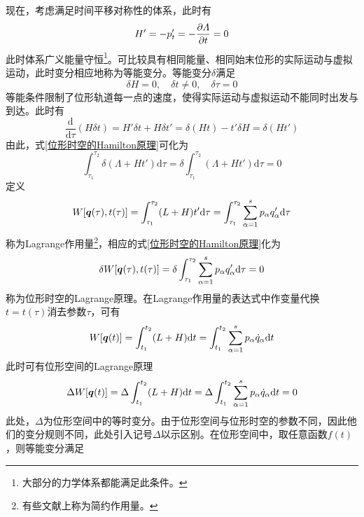 现在，考虑满足时间平移对称性的体系，此时有
\begin{equation*}
	H' = -p'_t = -\frac{\partial \varLambda}{\partial t} = 0
\end{equation*}
此时体系广义能量守恒\footnote{大部分的力学体系都能满足此条件。}。可比较具有相同能量、相同始末位形的实际运动与虚拟运动，此时变分相应地称为{\heiti 等能变分}。等能变分$\delta$满足
\begin{equation*}
	\delta H = 0,\quad \delta t \neq 0,\quad \delta \tau = 0
\end{equation*}
等能条件限制了位形轨道每一点的速度，使得实际运动与虚拟运动不能同时出发与到达。此时有
\begin{equation*}
	\frac{\mathrm{d}}{\mathrm{d} \tau}(H\delta t) = H' \delta t + H\delta t' = \delta (Ht) - t'\delta H = \delta (Ht')
\end{equation*}
由此，式\eqref{位形时空的Hamilton原理}可化为
\begin{equation*}
	\int_{\tau_1}^{\tau_2} \delta (\varLambda + Ht') \mathrm{d} \tau = \delta \int_{\tau_1}^{\tau_2} (\varLambda + Ht') \mathrm{d} \tau = 0
\end{equation*}
定义
\begin{equation*}
	W[\boldsymbol{q}(\tau),t(\tau)] = \int_{\tau_1}^{\tau_2} (L+H)t' \mathrm{d} \tau = \int_{\tau_1}^{\tau_2} \sum_{\alpha=1}^s p_\alpha q'_\alpha \mathrm{d} \tau 
\end{equation*}
称为{\heiti Lagrange作用量}\footnote{有些文献上称为{\heiti 简约作用量}。}，相应的式\eqref{位形时空的Hamilton原理}化为
\begin{equation*}
	\delta W[\boldsymbol{q}(\tau),t(\tau)] = \delta \int_{\tau_1}^{\tau_2} \sum_{\alpha=1}^s p_\alpha q'_\alpha \mathrm{d} \tau = 0
\end{equation*}
称为{\heiti 位形时空的Lagrange原理}。在Lagrange作用量的表达式中作变量代换$t=t(\tau)$消去参数$\tau$，可有
\begin{equation}
	W[\boldsymbol{q}(t)] = \int_{t_1}^{t_2} (L+H) \mathrm{d} t = \int_{t_1}^{t_2} \sum_{\alpha=1}^s p_\alpha \dot{q}_\alpha \mathrm{d} t
\end{equation}
此时可有{\heiti 位形空间的Lagrange原理}
\begin{equation}
	\Delta W[\boldsymbol{q}(t)] = \Delta \int_{t_1}^{t_2} (L+H) \mathrm{d} t = \Delta \int_{t_1}^{t_2} \sum_{\alpha=1}^s p_\alpha \dot{q}_\alpha \mathrm{d} t = 0
	\label{位形空间的Lagrange原理}
\end{equation}
此处，$\Delta$为位形空间中的等时变分。由于位形空间与位形时空的参数不同，因此他们的变分规则不同，此处引入记号$\Delta$以示区别。在位形空间中，取任意函数$f(t)$，则等能变分满足
